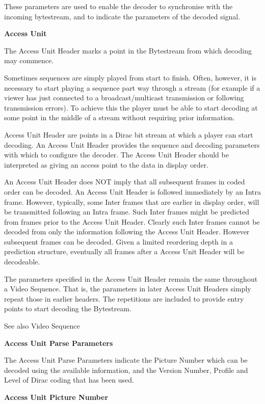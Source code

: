 These parameters are used to enable the decoder to synchronise with the
incoming bytestream, and to indicate the parameters of the decoded
signal.

\textbf{Access Unit}

The Access Unit Header marks a point in the Bytestream from which
decoding may commence.

Sometimes sequences are simply played from start to finish. Often,
however, it is necessary to start playing a sequence part way through a
stream (for example if a viewer has just connected to a
broadcast/multicast transmission or following transmission errors). To
achieve this the player must be able to start decoding at some point in
the middle of a stream without requiring prior information.

Access Unit Header are points in a Dirac bit stream at which a player
can start decoding. An Access Unit Header provides the sequence and
decoding parameters with which to configure the decoder. The Access Unit
Header should be interpreted as giving an access point to the data in
display order.

An Access Unit Header does NOT imply that all subsequent frames in coded
order can be decoded. An Access Unit Header is followed immediately by
an Intra frame. However, typically, some Inter frames that are earlier
in display order, will be transmitted following an Intra frame. Such
Inter frames might be predicted from frames prior to the Access Unit
Header. Clearly such Inter frames cannot be decoded from only the
information following the Access Unit Header. However subsequent frames
can be decoded. Given a limited reordering depth in a prediction
structure, eventually all frames after a Access Unit Header will be
decodeable.

The parameters specified in the Access Unit Header remain the same
throughout a Video Sequence. That is, the parameters in later Access
Unit Headers simply repeat those in earlier headers. The repetitions are
included to provide entry points to start decoding the Bytestream.

See also Video Sequence

\textbf{Access Unit Parse Parameters}

The Access Unit Parse Parameters indicate the Picture Number which can
be decoded using the available information, and the Version Number,
Profile and Level of Dirac coding that has been used.

\textbf{Access Unit Picture Number}

